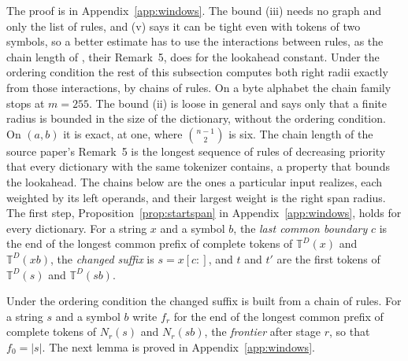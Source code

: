 \documentclass[11pt,a4paper]{article}
\theoremstyle{definition}
\theoremstyle{plain}
\newcommand{\T}{\mathbb{T}}
\begin{document}
The proof is in Appendix~\ref{app:windows}. The bound (iii) needs no graph and only the list of rules, and (v) says it
can be tight even with tokens of two symbols, so a better estimate has to use the interactions between rules, as the
chain length of \citet{berglund2023formalizing}, their Remark~5, does for the lookahead constant. Under the ordering
condition the rest of this subsection computes both right radii exactly from those interactions, by chains of rules. On
a byte alphabet the chain family stops at \(m = 255\). The bound (ii) is loose in general and says only that a finite
radius is bounded in the size of the dictionary, without the ordering condition. On \((a, b)\) it is exact, at one,
where \(\binom{n - 1}{2}\) is six. The chain length of the source paper's Remark~5 is the longest sequence of rules of
decreasing priority that every dictionary with the same tokenizer contains, a property that bounds the lookahead. The
chains below are the ones a particular input realizes, each weighted by its left operands, and their largest weight is
the right span radius. The first step, Proposition~\ref{prop:startspan} in Appendix~\ref{app:windows}, holds for every
dictionary. For a string \(x\) and a symbol \(b\), the \emph{last common boundary} \(c\) is the end of the longest
common prefix of complete tokens of \(\T^D(x)\) and \(\T^D(xb)\), the \emph{changed suffix} is \(s = x[c{:}]\), and
\(t\) and \(t'\) are the first tokens of \(\T^D(s)\) and \(\T^D(sb)\).

Under the ordering condition the changed suffix is built from a chain of rules. For a string \(s\) and a symbol \(b\)
write \(f_r\) for the end of the longest common prefix of complete tokens of \(N_r(s)\) and \(N_r(sb)\), the
\emph{frontier} after stage \(r\), so that \(f_0 = |s|\). The next lemma is proved in Appendix~\ref{app:windows}.

\end{document}
